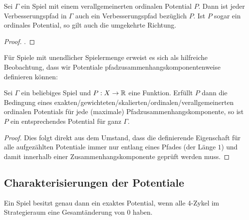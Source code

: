 \begin{satz}
	Sei $\Gamma$ ein Spiel mit einem verallgemeinerten ordinalen Potential $P$. Dann ist jeder Verbesserungspfad in $\Gamma$ auch ein Verbesserungspfad bezüglich $P$. Ist $P$ sogar ein ordinales Potential, so gilt auch die umgekehrte Richtung.
\end{satz}

\begin{proof}.
	
\end{proof}


Für Spiele mit unendlicher Spielermenge erweist es sich als hilfreiche Beobachtung, dass wir Potentiale pfadzusammenhangskomponentenweise definieren können:

\begin{beob}\label{beob:KompWeisePotentiale}
	Sei $\Gamma$ ein beliebiges Spiel und $P: X \to \mathbb{R}$ eine Funktion. Erfüllt $P$ dann die Bedingung eines exakten/gewichteten/skalierten/ordinalen/verallgemeinerten ordinalen Potentials für jede (maximale) Pfadzusammenhangskomponente, so ist $P$ ein entsprechendes Potential für ganz $\Gamma$.
\end{beob}

\begin{proof}
	Dies folgt direkt aus dem Umstand, dass die definierende Eigenschaft für alle aufgezählten Potentiale immer nur entlang eines Pfades (der Länge $1$) und damit innerhalb einer Zusammenhangskomponente geprüft werden muss.
\end{proof}

\subsection{Charakterisierungen der Potentiale}

\begin{satz}\label{satz:CharExPot}
	Ein Spiel besitzt genau dann ein exaktes Potential, wenn alle 4-Zykel im Strategieraum eine Gesamtänderung von $0$ haben.
\end{satz}

